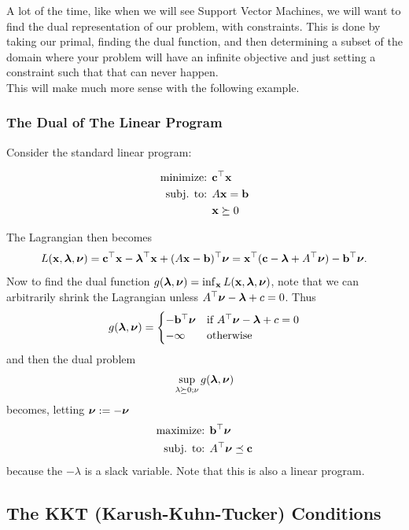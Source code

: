 \documentclass{article}
\begin{document}
A lot of the time, like when we will see Support Vector Machines, we will want
to find the dual representation of our problem, with constraints. This is
done by taking our primal, finding the dual function, and then determining
a subset of the domain where your problem will have an infinite objective
and just setting a constraint such that that can never happen.\\

This will make much more sense with the following example.

\subsubsection{The Dual of The Linear Program}

Consider the standard linear program:

\begin{align*}
    \text{minimize: } & {\bf c}^\top{\bf x}\\
    \text{subj. to: } & A{\bf x} = {\bf b}\\
                      & {\bf x} \succeq 0
\end{align*}

The Lagrangian then becomes
\[
    L({\bf x},\hbox{\boldmath$\lambda$},\hbox{\boldmath$\nu$}) = {\bf c}^\top{\bf x} - \hbox{\boldmath$\lambda$}^\top{\bf x} + (A{\bf x} - {\bf b})^\top\hbox{\boldmath$\nu$} = {\bf x}^\top({\bf c} - \hbox{\boldmath$\lambda$} + A^\top\hbox{\boldmath$\nu$}) - {\bf b}^\top\hbox{\boldmath$\nu$}.
\]
Now to find the dual function $g(\hbox{\boldmath$\lambda$}, \hbox{\boldmath$\nu$}) = \inf_{\bf x} L({\bf x},\hbox{\boldmath$\lambda$},\hbox{\boldmath$\nu$})$, note that
we can arbitrarily shrink the Lagrangian unless $A^\top\hbox{\boldmath$\nu$} - \hbox{\boldmath$\lambda$} + c = 0$. Thus
\[
    g(\hbox{\boldmath$\lambda$}, \hbox{\boldmath$\nu$}) = \begin{cases}
        -{\bf b}^\top\hbox{\boldmath$\nu$} & \text{if $A^\top\hbox{\boldmath$\nu$} - \hbox{\boldmath$\lambda$} + c = 0$}\\
        -\infty     & \text{otherwise}
    \end{cases}
\]
and then the dual problem
\[
    \sup_{\lambda\succeq 0; \nu} g(\hbox{\boldmath$\lambda$}, \hbox{\boldmath$\nu$})
\]
becomes, letting $\hbox{\boldmath$\nu$} := -\hbox{\boldmath$\nu$}$
\begin{align*}
    \text{maximize: } & {\bf b}^\top\hbox{\boldmath$\nu$}\\
    \text{subj. to: } & A^\top\hbox{\boldmath$\nu$} \preceq {\bf c}\\
\end{align*}
because the $-\lambda$ is a slack variable. Note that this is also a linear
program.

\subsection{The KKT (Karush-Kuhn-Tucker) Conditions}
\end{document}

